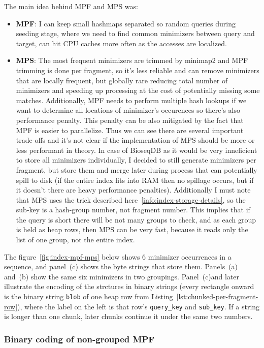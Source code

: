 The main idea behind MPF and MPS was:
\begin{itemize}
  \item \textbf{MPF}: I can keep small hashmaps separated so random queries during seeding stage, where we need to find common minimizers between query and target, can hit
  CPU caches more often as the accesses are localized.
  \item \textbf{MPS}: The most frequent minimizers are trimmed by minimap2 and MPF trimming is done per fragment, so it's less reliable and can remove minimizers 
  that are locally frequent, but globally rare reducing total number of minimizers and speeding up processing at the cost of potentially missing some matches. Additionally,
  MPF needs to perform multiple hash lookups if we want to determine all locations of minimizer's occurences so there's also performance penalty. This penalty can be 
  also mitigated by the fact that MPF is easier to parallelize.
  Thus we can see there are several important trade-offs and it's not clear if the implementation of MPS should be more or less performant in theory.
  In case of BioseqDB as it would be very inneficient to store all minimizers individually, I decided to still generate minimizers per fragment, but store them and merge later
  during process that can potentially spill to disk (if the entire index fits into RAM then no spillage occurs, but if it doesn't there are heavy performance penalties).
  Additionally I must note that MPS uses the trick described here~\ref{info:index-storage-details}, so the sub-key is a hash-group number, not fragment number.
  This implies that if the query is short there will be not many groups to check, and as each group is held as heap rows, then MPS can be very fast, because it reads only the list of one group, not the entire index.
\end{itemize}

The figure~\ref{fig:index-mpf-mps} below shows 6 minimizer occurrences in a sequence, and panel~(c) shows the byte strings that store them.
Panels~(a) and~(b) show the same six minimizers in two groupings.
Panel~(c)and later illustrate the encoding of the strctures in binary strings (every rectangle onward is the binary string \texttt{blob} of one heap row from Listing~\ref{lst:chunked-per-fragment-row}), where 
the label on the left is that row's \texttt{query\_key} and \texttt{sub\_key}.
If a string is longer than one chunk, later chunks continue it under the same two numbers.

\subsubsection{Binary coding of non-grouped MPF}

